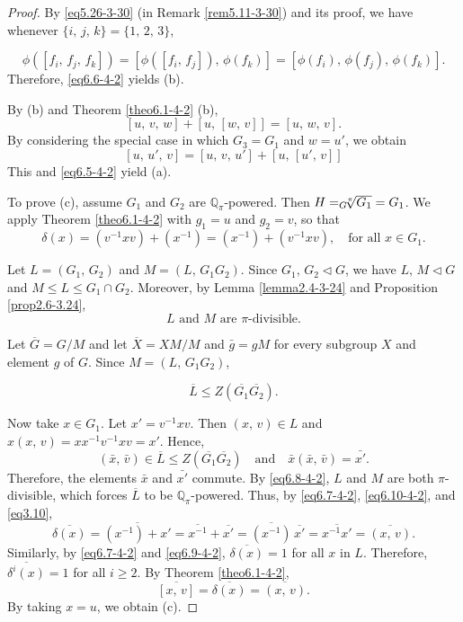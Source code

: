 \documentclass[mathscr]{amsart}
\theoremstyle{theorem}
\theoremstyle{definition}
\numberwithin{equation}{section}
\newcommand{\normal}{\triangleleft}
\def \({\left(}
\def \){\right)}
\def\[{\left[}
\def\]{\right]}
\def\Q{\mathbb{Q}}
\def\ol{\overline}
\begin{document}
\begin{proof}
By \eqref{eq5.26-3-30} (in Remark \ref{rem5.11-3-30}) and its proof,
we have whenever $\{i,\,j,\,k\}=\{1,\,2,\,3\}$,

$$\phi\(\[f_i,\,f_j,\,f_k\]\)=\[\phi\(\[f_i,\,f_j\]\),\,\phi\(f_k\)\]=\[\phi\(f_i\),\,\phi\(f_j\),\,\phi\(f_k\)\].$$
Therefore, \eqref{eq6.6-4-2}
 yields (b).

By (b) and Theorem \ref{theo6.1-4-2} (b),
$$\[u,\,v,\,w\]+\[u,\,\[w,\,v\]\]=\[u,\,w,\,v\].$$
By considering the special case in which $G_3=G_1$ and $w=u'$, we
obtain
$$[u,\,u',\,v]=[u,\,v,\,u']+[u,\,[u',\,v]]$$
This and \eqref{eq6.5-4-2} yield (a).

To prove (c), assume $G_1$ and $G_2$ are $\Q_\pi$-powered. Then
$H=_{G}\hspace*{-0.2cm}\sqrt[\pi]{G_1}=G_1$. We apply Theorem
\ref{theo6.1-4-2} with $g_1=u$ and $g_2=v$, so that
\begin{equation}\label{eq6.7-4-2}
\delta(x)=\(v^{-1}xv\)+\(x^{-1}\)=\(x^{-1}\)+\(v^{-1}xv\),\quad\text{for
all }x\in G_1.
\end{equation}

Let $L=\(G_1,\,G_2\)$ and $M=\(L,\,G_1G_2\).$ Since
$G_1,\,G_2\normal G$, we have $L,\,M\normal G$ and $M\leq L\leq
G_1\cap G_2$. Moreover, by Lemma \ref{lemma2.4-3-24} and Proposition
\ref{prop2.6-3.24},
\begin{equation}\label{eq6.8-4-2}
\text{$L$ and $M$ are $\pi$-divisible.}
\end{equation}

Let $\ol G=G/M$ and let $\ol X=XM/M$ and $\bar g=gM$ for every
subgroup $X$ and element $g$ of $G$. Since $M=\(L,\,G_1G_2\)$,

\begin{equation}\label{eq6.9-4-2}
\ol L\leq Z\(\ol{G_1}\ol{G_2}\).
\end{equation}

Now take $x\in G_1$. Let $x'=v^{-1}xv$. Then $(x,\,v)\in L$ and
$x(x,\,v)=xx^{-1}v^{-1}xv=x'$. Hence,
\begin{equation}\label{eq6.10-4-2}
\(\bar x,\,\bar v\)\in \ol L\leq
Z\(\ol{G_1}\ol{G_2}\)\quad\text{and}\quad \bar x(\bar x,\,\bar
v)=\bar{x'}.
\end{equation}
Therefore, the elements $\bar x$ and $\bar{x'}$ commute. By
\eqref{eq6.8-4-2}, $L$ and $M$ are both $\pi$-divisible, which
forces $\ol L$ to be $\Q_\pi$-powered. Thus, by \eqref{eq6.7-4-2},
\eqref{eq6.10-4-2}, and \eqref{eq3.10},
$$\ol{\delta(x)}=\ol{\(x^{-1}\)+x'}=\ol{x^{-1}}+\ol{x'}=
\ol{(x^{-1})}\,\ol{x'}=\ol{x^{-1}x'}=\ol{\(x,\,v\)}.$$ Similarly, by
\eqref{eq6.7-4-2} and \eqref{eq6.9-4-2}, $\ol{\delta(x)}=1$ for all
$x$ in $L$. Therefore, $\ol{\delta^i(x)}=1$ for all $i\geq2$. By
Theorem \ref{theo6.1-4-2},
$$\ol{[x,\,v]}=\ol{\delta(x)}=\ol{(x,\,v)}.$$
By taking $x=u$, we obtain (c).
\end{proof}
\end{document}
